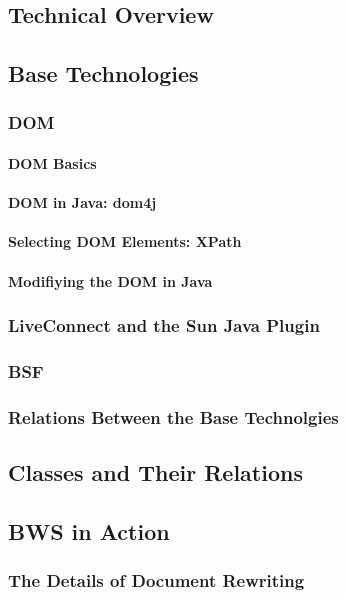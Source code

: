  \subsection{Technical Overview}
 \subsection{Base Technologies}
  \subsubsection{DOM}
  
   
   
   \paragraph{DOM Basics}
   
    
    
   \paragraph{DOM in Java: dom4j}
   \paragraph{Selecting DOM Elements: XPath}
   \paragraph{Modifiying the DOM in Java}
  \subsubsection{LiveConnect and the Sun Java Plugin}
  \subsubsection{BSF}
  \subsubsection{Relations Between the Base Technolgies}
 \subsection{Classes and Their Relations}
 \subsection{BWS in Action}
  \subsubsection{The Details of Document Rewriting}
